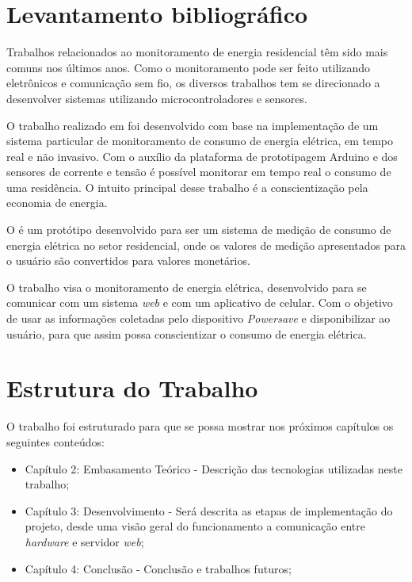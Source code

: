 \section{Levantamento bibliográfico}
Trabalhos relacionados ao monitoramento de energia residencial têm sido mais comuns nos últimos anos. Como o monitoramento pode ser feito utilizando eletrônicos e comunicação
sem fio, os diversos trabalhos tem se direcionado a desenvolver sistemas utilizando microcontroladores e sensores.


O trabalho realizado em \cite{ref-jlgb} foi desenvolvido com base na implementação de um sistema particular de monitoramento de consumo de energia elétrica, em tempo real e não invasivo.
Com o auxílio da plataforma de prototipagem Arduino e dos sensores de corrente e tensão é possível monitorar em tempo real o consumo de uma residência. O intuito principal
desse trabalho é a conscientização pela economia de energia.

O \cite{ref-apc} é um protótipo desenvolvido para ser um sistema de medição de consumo de energia elétrica no setor residencial, onde os valores de medição
apresentados para o usuário são convertidos para valores monetários.


O trabalho \cite{ref-rpc} visa o monitoramento de energia elétrica, desenvolvido para se comunicar com um sistema \textit{web} e com um aplicativo de celular.
Com o objetivo de usar as informações coletadas pelo dispositivo \textit{Powersave} e disponibilizar ao usuário, para que assim possa conscientizar o consumo de energia elétrica.

\section{Estrutura do Trabalho}
O trabalho foi estruturado para que se possa mostrar nos próximos capítulos os seguintes conteúdos:
\begin{itemize}
	\item Capítulo 2: Embasamento Teórico - Descrição das tecnologias utilizadas neste trabalho;
	\item Capítulo 3: Desenvolvimento - Será descrita as etapas de implementação do projeto, desde uma visão geral do funcionamento a comunicação entre \textit{hardware} e servidor \textit{web};
	\item Capítulo 4: Conclusão - Conclusão e trabalhos futuros;
\end{itemize}